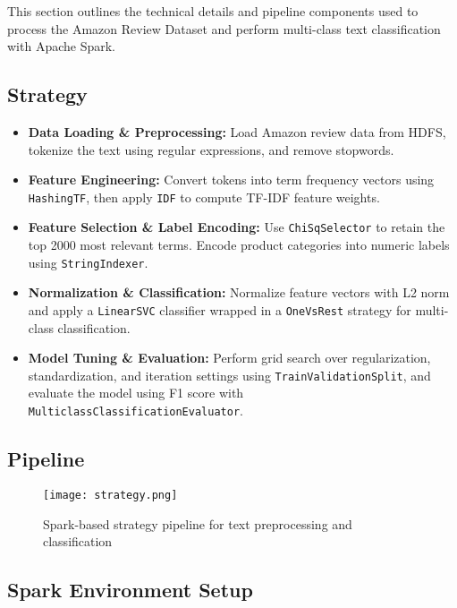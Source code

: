 \documentclass[12pt]{article}
\begin{document}
This section outlines the technical details and pipeline components used to process the Amazon Review Dataset and perform multi-class text classification with Apache Spark.

\subsection{Strategy}

\begin{itemize}
  \item \textbf{Data Loading \& Preprocessing:} Load Amazon review data from HDFS, tokenize the text using regular expressions, and remove stopwords.
  
  \item \textbf{Feature Engineering:} Convert tokens into term frequency vectors using \texttt{HashingTF}, then apply \texttt{IDF} to compute TF-IDF feature weights.
  
  \item \textbf{Feature Selection \& Label Encoding:} Use \texttt{ChiSqSelector} to retain the top 2000 most relevant terms. Encode product categories into numeric labels using \texttt{StringIndexer}.
  
  \item \textbf{Normalization \& Classification:} Normalize feature vectors with L2 norm and apply a \texttt{LinearSVC} classifier wrapped in a \texttt{OneVsRest} strategy for multi-class classification.
  
  \item \textbf{Model Tuning \& Evaluation:} Perform grid search over regularization, standardization, and iteration settings using \texttt{TrainValidationSplit}, and evaluate the model using F1 score with \texttt{MulticlassClassificationEvaluator}.
\end{itemize}

\subsection{Pipeline}
\begin{figure}[H]
  \centering
  \texttt{[image: strategy.png]}
  \caption{Spark-based strategy pipeline for text preprocessing and classification}
  \label{fig:pipeline-strategy}
\end{figure}


\subsection{Spark Environment Setup}
\end{document}
